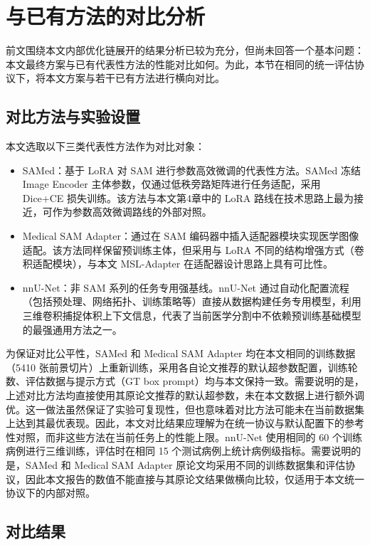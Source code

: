\section{与已有方法的对比分析}

前文围绕本文内部优化链展开的结果分析已较为充分，但尚未回答一个基本问题：本文最终方案与已有代表性方法的性能对比如何。为此，本节在相同的统一评估协议下，将本文方案与若干已有方法进行横向对比。

\subsection{对比方法与实验设置}

本文选取以下三类代表性方法作为对比对象：

\begin{itemize}
  \item SAMed\cite{zhang2024samed}：基于 LoRA 对 SAM 进行参数高效微调的代表性方法。SAMed 冻结 Image Encoder 主体参数，仅通过低秩旁路矩阵进行任务适配，采用 Dice+CE 损失训练。该方法与本文第4章中的 LoRA 路线在技术思路上最为接近，可作为参数高效微调路线的外部对照。
  \item Medical SAM Adapter\cite{wu2023medsamadapter}：通过在 SAM 编码器中插入适配器模块实现医学图像适配。该方法同样保留预训练主体，但采用与 LoRA 不同的结构增强方式（卷积适配模块），与本文 MSL-Adapter 在适配器设计思路上具有可比性。
  \item nnU-Net\cite{isensee2021nnunet}：非 SAM 系列的任务专用强基线。nnU-Net 通过自动化配置流程（包括预处理、网络拓扑、训练策略等）直接从数据构建任务专用模型，利用三维卷积捕捉体积上下文信息，代表了当前医学分割中不依赖预训练基础模型的最强通用方法之一。
\end{itemize}

为保证对比公平性，SAMed 和 Medical SAM Adapter 均在本文相同的训练数据（5410 张前景切片）上重新训练，采用各自论文推荐的默认超参数配置，训练轮数、评估数据与提示方式（GT box prompt）均与本文保持一致。需要说明的是，上述对比方法均直接使用其原论文推荐的默认超参数，未在本文数据上进行额外调优。这一做法虽然保证了实验可复现性，但也意味着对比方法可能未在当前数据集上达到其最优表现。因此，本文对比结果应理解为在统一协议与默认配置下的参考性对照，而非这些方法在当前任务上的性能上限。nnU-Net 使用相同的 60 个训练病例进行三维训练，评估时在相同 15 个测试病例上统计病例级指标。需要说明的是，SAMed 和 Medical SAM Adapter 原论文均采用不同的训练数据集和评估协议，因此本文报告的数值不能直接与其原论文结果做横向比较，仅适用于本文统一协议下的内部对照。

\subsection{对比结果}

